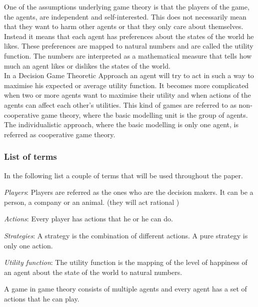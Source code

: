 One of the assumptions underlying game theory is that the players of the game, the agents, are independent and self-interested. This does not necessarily mean that they want to harm other agents or that they only care about themselves. 
Instead it means that each agent has preferences about the states of the world he likes. These preferences are mapped to natural numbers and are called the utility function. The numbers are interpreted as a mathematical measure that tells how much an agent likes or dislikes the states of the world. \\
In a Decision Game Theoretic Approach an agent will try to act in such a way to maximise his expected or average utility function. It becomes more complicated when two or more agents want to maximise their utility and when actions of the agents can affect each other's utilities. This kind of games are referred to as non-cooperative game theory, where the basic modelling unit is the group of agents. The individualistic approach, where the basic modelling is only one agent, is referred as cooperative game theory. 

\subsubsection{List of terms}
In the following list a couple of terms that will be used throughout the paper.
\begin{description}
\item \textit{Players}: Players are referred as the ones who are the decision makers. It can be a person, a company or an animal.  (they will act rational )
\item \textit{Actions}: Every player has actions that he or he can do. 
\item \textit{Strategies}: A strategy is the combination of different actions. A pure strategy is only one action.
\item \textit{Utility function}: The utility function is the mapping of the level of happiness of an agent about the state of the world to natural numbers.

\end{description}

A game in game theory consists of multiple agents and every agent has a set of actions that he can play. 

